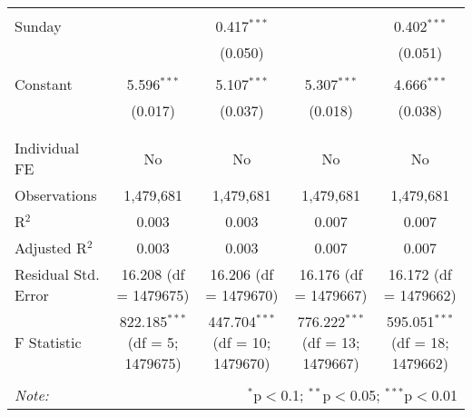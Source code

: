 \documentclass[
]{article}
\begin{document}
\begin{table}[!htbp]
{\begin{tabular}{@{\extracolsep{5pt}}lcccc}
  & & & & \\ 
 Sunday &  & 0.417$^{***}$ &  & 0.402$^{***}$ \\ 
  &  & (0.050) &  & (0.051) \\ 
  & & & & \\ 
 Constant & 5.596$^{***}$ & 5.107$^{***}$ & 5.307$^{***}$ & 4.666$^{***}$ \\ 
  & (0.017) & (0.037) & (0.018) & (0.038) \\ 
  & & & & \\ 
\hline \\[-1.8ex] 
Individual FE & No & No & No & No \\ 
Observations & 1,479,681 & 1,479,681 & 1,479,681 & 1,479,681 \\ 
R$^{2}$ & 0.003 & 0.003 & 0.007 & 0.007 \\ 
Adjusted R$^{2}$ & 0.003 & 0.003 & 0.007 & 0.007 \\ 
Residual Std. Error & 16.208 (df = 1479675) & 16.206 (df = 1479670) & 16.176 (df = 1479667) & 16.172 (df = 1479662) \\ 
F Statistic & 822.185$^{***}$ (df = 5; 1479675) & 447.704$^{***}$ (df = 10; 1479670) & 776.222$^{***}$ (df = 13; 1479667) & 595.051$^{***}$ (df = 18; 1479662) \\ 
\hline 
\hline \\[-1.8ex] 
\textit{Note:}  & \multicolumn{4}{r}{$^{*}$p$<$0.1; $^{**}$p$<$0.05; $^{***}$p$<$0.01} \\ 
\end{tabular}
} 
\end{table} 
\newpage
\end{document}

